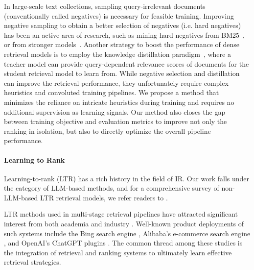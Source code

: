 \documentclass{article}
\begin{document}
In large-scale text collections, sampling query-irrelevant documents (conventionally called negatives) is necessary for feasible training. 
Improving negative sampling to obtain a better selection of negatives (i.e. hard negatives) has been an active area of research, such as mining hard negatives from BM25~\citep{Xiong2020ApproximateNN}, or from stronger models~\citep{Qu2020RocketQAAO,Formal2021SPLADEVS}.
Another strategy to boost the performance of dense retrieval models is to employ the knowledge distillation paradigm~\citep{Qu2020RocketQAAO}, where a teacher model can provide query-dependent relevance scores of documents for the student retrieval model to learn from. 
While negative selection and distillation can improve the retrieval performance, they unfortunately require complex heuristics and convoluted training pipelines.
We propose a method that minimizes the reliance on intricate heuristics during training and requires no additional supervision as learning signals. Our method also closes the gap between training objective and evaluation metrics to improve not only the ranking in isolation, but also to directly optimize the overall pipeline performance.













\paragraph{Learning to Rank} 
Learning-to-rank (LTR) has a rich history in the field of IR. Our work falls under the category of LLM-based methods, and for a comprehensive survey of non-LLM-based LTR retrieval models, we refer readers to \cite{liu2009learning}. 

LTR methods used in multi-stage retrieval pipelines have attracted significant interest from both academia \citep{matveeva2006high, wang2011cascade, asadi2013effectiveness, chen2017efficient, mackenzie2018query, Nogueira2019PassageRW, khattab2020colbert, luan2021sparse, guo2022semantic} and industry \citep{amazon_blog}. Well-known product deployments of such systems include the Bing search engine \citep{pedersen2010query}, Alibaba's e-commerce search engine \citep{liu2017cascade}, and OpenAI's ChatGPT plugins \citep{chatgpt_plugin}. 
The common thread among these studies is the integration of retrieval and ranking systems to ultimately learn effective retrieval strategies.
\end{document}
